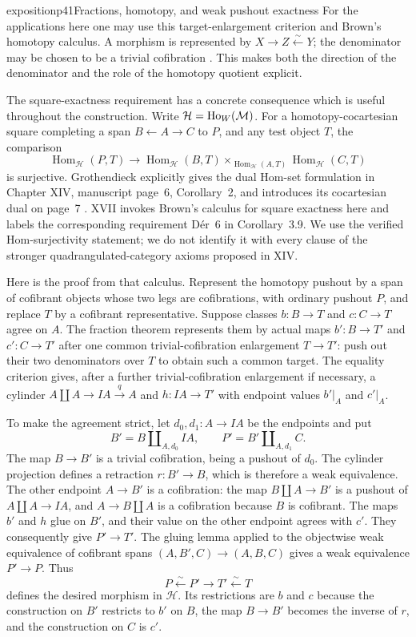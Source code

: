 \begin{dcomment}{exposition}{p41}{Fractions, homotopy, and weak pushout exactness}
For the applications here one may use this target-enlargement criterion and Brown's homotopy calculus. A morphism is represented by $X\to Z\xleftarrow{\sim}Y$; the denominator may be chosen to be a trivial cofibration \citep[Theorem 6.4.5(1)(a)]{RadulescuBanu2009}. This makes both the direction of the denominator and the role of the homotopy quotient explicit.

The square-exactness requirement has a concrete consequence which is useful throughout the construction. Write $\mathcal H=\operatorname{Ho}_W(\mathcal{M})$. For a homotopy-cocartesian square completing a span $B\leftarrow A\to C$ to $P$, and any test object $T$, the comparison
\[
 \operatorname{Hom}_{\mathcal H}(P,T)\longrightarrow
 \operatorname{Hom}_{\mathcal H}(B,T)
 \times_{\operatorname{Hom}_{\mathcal H}(A,T)}
 \operatorname{Hom}_{\mathcal H}(C,T)
\]
is surjective. Grothendieck explicitly gives the dual Hom-set formulation in Chapter XIV, manuscript page~6, Corollary~2, and introduces its cocartesian dual on page~7 \citep{GrothendieckDerivateursXIV}. XVII invokes Brown's calculus for square exactness here and labels the corresponding requirement D\'er~6 in Corollary~3.9. We use the verified Hom-surjectivity statement; we do not identify it with every clause of the stronger quadrangulated-category axioms proposed in XIV.

Here is the proof from that calculus. Represent the homotopy pushout by a span of cofibrant objects whose two legs are cofibrations, with ordinary pushout $P$, and replace $T$ by a cofibrant representative. Suppose classes $b:B\to T$ and $c:C\to T$ agree on $A$. The fraction theorem represents them by actual maps $b':B\to T'$ and $c':C\to T'$ after one common trivial-cofibration enlargement $T\to T'$: push out their two denominators over $T$ to obtain such a common target. The equality criterion gives, after a further trivial-cofibration enlargement if necessary, a cylinder $A\amalg A\to IA\xrightarrow{q}A$ and $h:IA\to T'$ with endpoint values $b'|_A$ and $c'|_A$.

To make the agreement strict, let $d_0,d_1:A\to IA$ be the endpoints and put
\[
 B'=B\amalg_{A,d_0}IA,
 \qquad P'=B'\amalg_{A,d_1}C.
\]
The map $B\to B'$ is a trivial cofibration, being a pushout of $d_0$. The cylinder projection defines a retraction $r:B'\to B$, which is therefore a weak equivalence. The other endpoint $A\to B'$ is a cofibration: the map $B\amalg A\to B'$ is a pushout of $A\amalg A\to IA$, and $A\to B\amalg A$ is a cofibration because $B$ is cofibrant. The maps $b'$ and $h$ glue on $B'$, and their value on the other endpoint agrees with $c'$. They consequently give $P'\to T'$. The gluing lemma applied to the objectwise weak equivalence of cofibrant spans $(A,B',C)\to(A,B,C)$ gives a weak equivalence $P'\to P$. Thus
\[
 P\xleftarrow{\sim}P'\longrightarrow T'\xleftarrow{\sim}T
\]
defines the desired morphism in $\mathcal H$. Its restrictions are $b$ and $c$ because the construction on $B'$ restricts to $b'$ on $B$, the map $B\to B'$ becomes the inverse of $r$, and the construction on $C$ is $c'$.


\end{dcomment}
